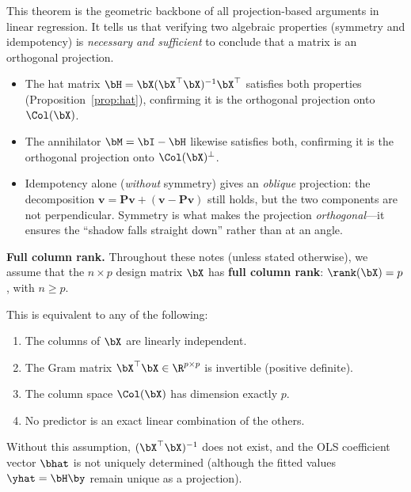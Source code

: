 \begin{remark}
This theorem is the geometric backbone of all projection-based arguments in
linear regression.  It tells us that verifying two algebraic properties
(symmetry and idempotency) is \emph{necessary and sufficient} to conclude
that a matrix is an orthogonal projection.
\begin{itemize}[nosep]
  \item The hat matrix $\bH = \bX(\bX^\top\bX)^{-1}\bX^\top$ satisfies both
        properties (Proposition~\ref{prop:hat}), confirming it is the orthogonal
        projection onto $\Col(\bX)$.
  \item The annihilator $\bM = \bI - \bH$ likewise satisfies both, confirming
        it is the orthogonal projection onto $\Col(\bX)^\perp$.
  \item Idempotency alone (\emph{without} symmetry) gives an \emph{oblique}
        projection: the decomposition $\bm{v} = \bm{P}\bm{v} + (\bm{v}-\bm{P}\bm{v})$
        still holds, but the two components are not perpendicular.
        Symmetry is what makes the projection \emph{orthogonal}---it ensures
        the ``shadow falls straight down'' rather than at an angle.
\end{itemize}
\end{remark}



\begin{tcolorbox}[
  colback=colspace!8, colframe=colspace!80!black,
  fonttitle=\bfseries, title=Standing Assumption,
  arc=2mm, boxrule=0.8pt
]
\textbf{Full column rank.}
Throughout these notes (unless stated otherwise), we assume that the
$n\times p$ design matrix $\bX$ has \textbf{full column rank}:
$\rank(\bX) = p$, with $n \ge p$.

This is equivalent to any of the following:
\begin{enumerate}[nosep,label=(\roman*)]
  \item The columns of $\bX$ are linearly independent.
  \item The Gram matrix $\bX^\top\bX\in\R^{p\times p}$ is invertible
        (positive definite).
  \item The column space $\Col(\bX)$ has dimension exactly $p$.
  \item No predictor is an exact linear combination of the others.
\end{enumerate}
Without this assumption, $(\bX^\top\bX)^{-1}$ does not exist, and the OLS
coefficient vector $\bhat$ is not uniquely determined (although the
fitted values $\yhat = \bH\by$ remain unique as a projection).
\end{tcolorbox}


